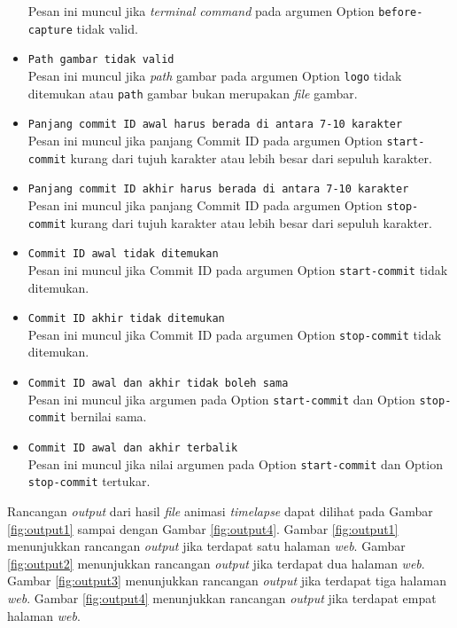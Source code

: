 \begin{itemize}
Pesan ini muncul jika \textit{terminal command} pada argumen Option \texttt{before-capture} tidak valid.
\item \texttt{Path gambar tidak valid}\\
Pesan ini muncul jika \textit{path} gambar pada argumen Option \texttt{logo} tidak ditemukan atau \texttt{path} gambar bukan merupakan \textit{file} gambar.
\item \texttt{Panjang commit ID awal harus berada di antara 7-10 karakter}\\
Pesan ini muncul jika panjang Commit ID pada argumen Option \texttt{start-commit} kurang dari tujuh karakter atau lebih besar dari sepuluh karakter.
\item \texttt{Panjang commit ID akhir harus berada di antara 7-10 karakter}\\
Pesan ini muncul jika panjang Commit ID pada argumen Option \texttt{stop-commit} kurang dari tujuh karakter atau lebih besar dari sepuluh karakter.
\item \texttt{Commit ID awal tidak ditemukan}\\
Pesan ini muncul jika Commit ID pada argumen Option \texttt{start-commit} tidak ditemukan.
\item \texttt{Commit ID akhir tidak ditemukan}\\
Pesan ini muncul jika Commit ID pada argumen Option \texttt{stop-commit} tidak ditemukan.
\item \texttt{Commit ID awal dan akhir tidak boleh sama}\\
Pesan ini muncul jika argumen pada Option \texttt{start-commit} dan Option \texttt{stop-commit} bernilai sama.
\item \texttt{Commit ID awal dan akhir terbalik}\\
Pesan ini muncul jika nilai argumen pada Option \texttt{start-commit} dan Option \texttt{stop-commit} tertukar.

\end{itemize}

Rancangan \textit{output} dari hasil \textit{file} animasi \textit{timelapse} dapat dilihat pada Gambar \ref{fig:output1} sampai dengan Gambar \ref{fig:output4}. Gambar \ref{fig:output1} menunjukkan rancangan \textit{output} jika terdapat satu halaman \textit{web}. Gambar \ref{fig:output2} menunjukkan rancangan \textit{output} jika terdapat dua halaman \textit{web}. Gambar \ref{fig:output3} menunjukkan rancangan \textit{output} jika terdapat tiga halaman \textit{web}. Gambar \ref{fig:output4} menunjukkan rancangan \textit{output} jika terdapat empat halaman \textit{web}. 

